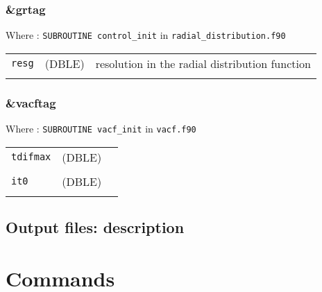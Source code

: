 \documentclass[10pt,a4paper]{article}
\begin{document}

\subsubsection{\&grtag}

Where : \verb?SUBROUTINE control_init? in \verb?radial_distribution.f90?

\begin{tabular}{lcc}
\\
\verb?resg? & (DBLE) & resolution in the radial distribution function \\
\\
\end{tabular}

\subsubsection{\&vacftag}

Where : \verb?SUBROUTINE vacf_init? in \verb?vacf.f90?


\begin{tabular}{lcc}
\\
\verb?tdifmax?  & (DBLE) & \\ 
\\
\verb?it0? & (DBLE) & \\
\\
\end{tabular}


\subsection{Output files: description}


\section{Commands}
\end{document}
